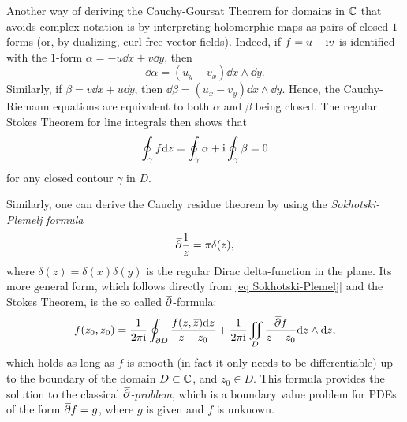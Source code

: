 \begin{rem}
    Another way of deriving the Cauchy-Goursat Theorem for domains in $\mathbb{C}$ that avoids complex notation is by interpreting holomorphic maps as pairs of closed $1$-forms (or, by dualizing, curl-free vector fields). Indeed, if $f=u+\mathrm{i} v$ is identified with the $1$-form $\alpha=-u\dd x+v\dd y$, then 
    \[\dd\alpha=(u_y+v_x)\dd x\wedge\dd y.\]
    Similarly, if $\beta=v\dd x+u\dd y$, then $\dd \beta=(u_x-v_y)\dd x\wedge\dd y$. Hence, the Cauchy-Riemann equations are equivalent to both $\alpha$ and $\beta$ being closed. The regular Stokes Theorem for line integrals then shows that 
    \[\oint_\gamma f{\mathrm{d}} z=\oint_\gamma\alpha+\mathrm{i} \oint_\gamma \beta=0\] for any closed contour $\gamma$ in $D$.
\end{rem}

\begin{rem}
    Similarly, one can derive the Cauchy residue theorem by using the \emph{Sokhotski-Plemelj formula} 
    \[\wb\partial \frac{1}{z}=\pi \delta(z),\label{eq Sokhotski-Plemelj}\] where $\delta(z)=\delta(x)\delta(y)$ is the regular Dirac delta-function in the plane. Its more general form, which follows directly from \eqref{eq Sokhotski-Plemelj} and the Stokes Theorem, is the so called $\wb\partial$-formula:
    \[f(z_0,\wb{z}_0)=\frac{1}{2\pi \i}\oint_{\partial D}\frac{f(z,\wb{z})\dd z}{z-z_0}+\frac{1}{2\pi\i}\iint_D \frac{\wb\partial f}{z-z_0}\dd z\wedge\dd\wb{z},\label{eq dbar formula}\]
    which holds as long as $f$ is smooth (in fact it only needs to be differentiable) up to the boundary of the domain $D\subset\mathbb{C}$, and $z_0\in D$.
    This formula provides the solution to the classical \emph{$\wb\partial$-problem}, which is a boundary value problem for PDEs of the form $\wb\partial f=g$, where $g$ is given and $f$ is unknown.
\end{rem}


